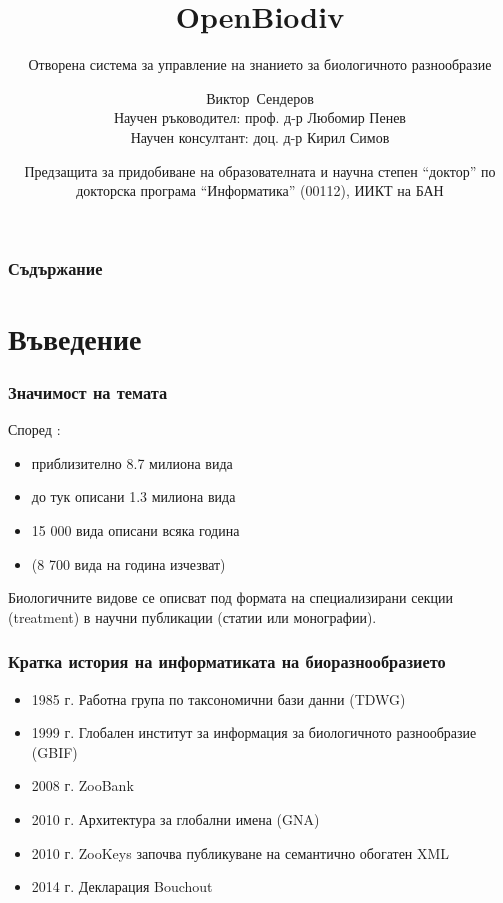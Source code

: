 \documentclass[bulgarian]{beamer}
\title[OpenBiodiv] %
{OpenBiodiv}
\subtitle{Отворена система за управление на знанието за биологичното разнообразие}
\author[Сендеров, Виктор] %
{Виктор~Сендеров\\{\tiny Научен ръководител: проф. д-р Любомир Пенев\inst{1}}\\{\tiny Научен консултант: доц. д-р Кирил Симов\inst{2}}}
\institute[] %
{
  \inst{1}%
  Академично издателство ``Пенсофт''\\
  \and
  \inst{2}%
  Институт по информационни и комуникационни технологии\\
  Бъгларска академия на науките
}
\date[18.12.2018] %
{Предзащита за придобиване на образователната и научна степен ``доктор'' по докторска програма ``Информатика'' (00112), ИИКТ на БАН}
\begin{document}
\frame{\titlepage}


\begin{frame}
\frametitle{Съдържание}
\tableofcontents
\end{frame}


\section{Въведение}

\begin{frame}
\frametitle{Значимост на темата}
Според \cite{mora_how_2011}:
\begin{itemize}
    \item приблизително 8.7 милиона вида
    \item до тук описани 1.3 милиона вида
    \item 15 000 вида описани всяка година
    \item (8 700 вида на година изчезват)
\end{itemize}
 
\vspace{5mm}

Биологичните видове се описват под формата на специализирани секции (treatment) в научни публикации (статии или монографии).

\end{frame}

\begin{frame}
\frametitle{Кратка история на информатиката на биоразнообразието}

\begin{itemize}
    \item 1985 г. Работна група по таксономични бази данни (TDWG)
    \item 1999 г. Глобален институт за информация за биологичното разнообразие (GBIF)
    \item 2008 г. ZooBank
    \item 2010 г. Архитектура за глобални имена (GNA)
    \item 2010 г. ZooKeys започва публикуване на семантично обогатен XML
    \item 2014 г. Декларация Bouchout
\end{itemize}

\end{frame}
\end{document}
